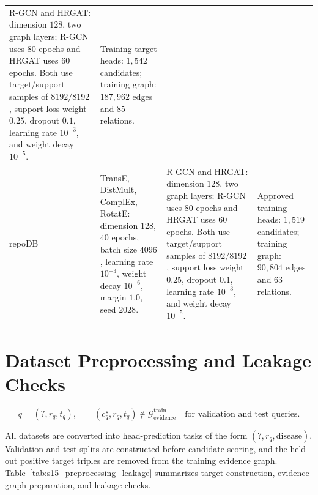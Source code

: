 \documentclass[11pt]{article}
\begin{document}
\begin{table}[H]
\begin{tabularx}{\textwidth}{L{0.12\textwidth} Y Y Y}
    R-GCN and HRGAT: dimension \(128\), two graph layers; R-GCN uses \(80\) epochs and HRGAT uses \(60\) epochs. Both use target/support samples of \(8192/8192\), support loss weight \(0.25\), dropout \(0.1\), learning rate \(10^{-3}\), and weight decay \(10^{-5}\). &
    Training target heads: \(1{,}542\) candidates; training graph: \(187{,}962\) edges and \(85\) relations. \\
    \addlinespace
    repoDB &
    TransE, DistMult, ComplEx, RotatE: dimension \(128\), \(40\) epochs, batch size \(4096\), learning rate \(10^{-3}\), weight decay \(10^{-6}\), margin \(1.0\), seed \(2028\). &
    R-GCN and HRGAT: dimension \(128\), two graph layers; R-GCN uses \(80\) epochs and HRGAT uses \(60\) epochs. Both use target/support samples of \(8192/8192\), support loss weight \(0.25\), dropout \(0.1\), learning rate \(10^{-3}\), and weight decay \(10^{-5}\). &
    Approved training heads: \(1{,}519\) candidates; training graph: \(90{,}804\) edges and \(63\) relations. \\
    \bottomrule
    \end{tabularx}
    \end{table}
    \FloatBarrier

    \section{Dataset Preprocessing and Leakage Checks}

    \[
    q=(?,r_q,t_q),\qquad
    (c^\star_q,r_q,t_q)\notin \mathcal{G}^{\mathrm{train}}_{\mathrm{evidence}}
    \quad\text{for validation and test queries.}
    \]

    All datasets are converted into head-prediction tasks of the form \((?,r_q,\mathrm{disease})\). Validation and test splits are constructed before candidate scoring, and the held-out positive target triples are removed from the training evidence graph. Table~\ref{tab:s15_preprocessing_leakage} summarizes target construction, evidence-graph preparation, and leakage checks.
\end{document}
